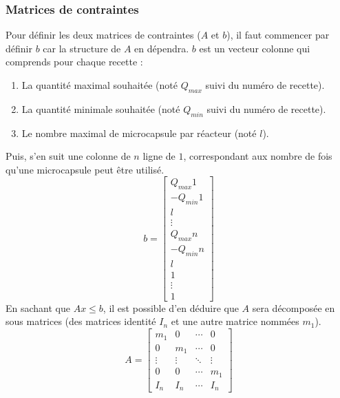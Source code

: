 \subsubsection{Matrices de contraintes}\label{subsubsection:contraintes}
Pour définir les deux matrices de contraintes ($A$ et $b$), il faut commencer par définir $b$ car la structure de $A$ en dépendra.
$b$ est un vecteur colonne qui comprends pour chaque recette :
\begin{enumerate}
    \item La quantité maximal souhaitée (noté $Q_{max}$ suivi du numéro de recette).
    \item La quantité minimale souhaitée (noté $Q_{min}$ suivi du numéro de recette).
    \item Le nombre maximal de \gls{microcapsule} par réacteur (noté $l$).
\end{enumerate}
Puis, s'en suit une colonne de $n$ ligne de $1$, correspondant aux nombre de fois qu'une \gls{microcapsule} peut être utilisé.
\begin{equation}
    b = \left[
        \begin{array}{c}
            Q_{max}1\\
            -Q_{min}1\\
            l\\
            \vdots\\
            Q_{max}n\\
            -Q_{min}n\\
            l\\
                1 \\
                \vdots \\
                1
        \end{array}
    \right]
\end{equation}
En sachant que $Ax \leq b$, il est possible d'en déduire que $A$ sera décomposée en sous matrices (des matrices identité $I_n$ et une autre matrice nommées $m_1$).
\begin{equation}
    A = \left[\begin{array}{cccc}
        m_1    & 0       & \cdots & 0\\
        0      & m_1     & \cdots & 0\\
        \vdots & \vdots  & \ddots & \vdots \\
        0      & 0       & \cdots &  m_1 \\
        I_n    & I_n     & \cdots &  I_n
    \end{array}\right]
\end{equation}
